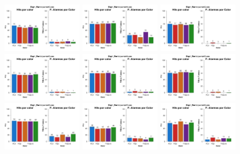 \begin{figure}[th]
\includegraphics[width=0.30\textwidth]{Figures/Color_Exp1_P10} \includegraphics[width=0.30\textwidth]{Figures/Color_Exp1_P11} \includegraphics[width=0.30\textwidth]{Figures/Color_Exp1_P12}
\includegraphics[width=0.30\textwidth]{Figures/Color_Exp1_P13} \includegraphics[width=0.30\textwidth]{Figures/Color_Exp1_P14} \includegraphics[width=0.30\textwidth]{Figures/Color_Exp1_P15}
\includegraphics[width=0.30\textwidth]{Figures/Color_Exp1_P16} \includegraphics[width=0.30\textwidth]{Figures/Color_Exp1_P17} \includegraphics[width=0.30\textwidth]{Figures/Color_Exp1_P18}

\end{figure}
